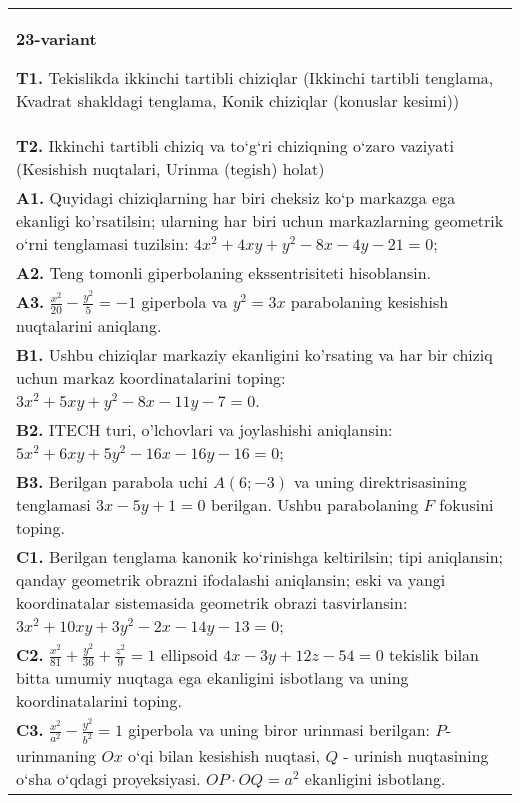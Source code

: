\documentclass{article}
\begin{document}
\begin{tabular}{m{17cm}}
\textbf{23-variant}
\newline

\textbf{T1.} Tekislikda ikkinchi tartibli chiziqlar (Ikkinchi tartibli tenglama, Kvadrat shakldagi tenglama, Konik chiziqlar (konuslar kesimi)) \\
\textbf{T2.} Ikkinchi tartibli chiziq va to‘g‘ri chiziqning o‘zaro vaziyati (Kesishish nuqtalari, Urinma (tegish) holat) \\
\textbf{A1.} Quyidagi chiziqlarning har biri cheksiz ko‘p markazga ega ekanligi ko'rsatilsin; ularning har biri uchun markazlarning geometrik o‘rni tenglamasi tuzilsin: $4 x^2+4 x y+y^2-8 x-4 y-21=0$; \\
\textbf{A2.} Teng tomonli giperbolaning ekssentrisiteti hisoblansin. \\
\textbf{A3.} $\frac{x^2}{20}-\frac{y^2}{5}=-1$ giperbola va $y^2=3 x$ parabolaning kesishish nuqtalarini aniqlang. \\
\textbf{B1.} Ushbu chiziqlar markaziy ekanligini ko'rsating va har bir chiziq uchun markaz koordinatalarini toping: $3x^2+5xy+y^2-8x-11y-7=0$. \\
\textbf{B2.} ITECH turi, o'lchovlari va joylashishi aniqlansin: $5 x^2+6 x y+5 y^2-16 x-16 y-16=0$; \\
\textbf{B3.} Berilgan parabola uchi $A(6;-3)$ va uning direktrisasining tenglamasi $3x-5y+1=0$ berilgan. Ushbu parabolaning $F$ fokusini toping. \\
\textbf{C1.} Berilgan tenglama kanonik ko‘rinishga keltirilsin; tipi aniqlansin; qanday geometrik obrazni ifodalashi aniqlansin; eski va yangi koordinatalar sistemasida geometrik obrazi tasvirlansin: $3 x^2+10 x y+3 y^2-2 x-14 y-13=0$; \\
\textbf{C2.} $\frac{x^2}{81}+\frac{y^2}{36}+\frac{z^2}{9}=1$ ellipsoid $4 x-3 y+12 z-54=0$ tekislik bilan bitta umumiy nuqtaga ega ekanligini isbotlang va uning koordinatalarini toping. \\
\textbf{C3.} $\frac{x^2}{a^2}-\frac{y^2}{b^2}=1$ giperbola va uning biror urinmasi berilgan: $P$-urinmaning $O x$ o‘qi bilan kesishish nuqtasi, $Q$ - urinish nuqtasining o‘sha o‘qdagi proyeksiyasi. $O P \cdot O Q=a^2$ ekanligini isbotlang. \\

\end{tabular}
\vspace{1cm}
\end{document}
